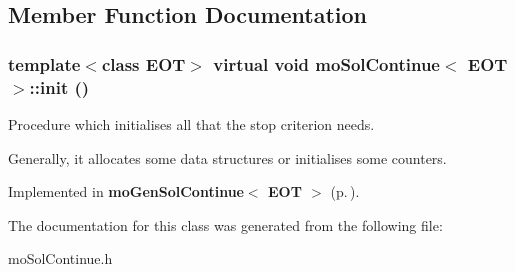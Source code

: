 \subsection{Member Function Documentation}
\subsubsection{\setlength{\rightskip}{0pt plus 5cm}template$<$class EOT$>$ virtual void {\bf mo\-Sol\-Continue}$<$ EOT $>$::init ()\hspace{0.3cm}{\tt  [pure virtual]}}\label{classmo_sol_continue_064dc966a210f4ffb9515be3f03ca4c7}


Procedure which initialises all that the stop criterion needs. 

Generally, it allocates some data structures or initialises some counters. 

Implemented in {\bf mo\-Gen\-Sol\-Continue$<$ EOT $>$} {\rm (p.\,\pageref{classmo_gen_sol_continue_6c5db8182157584b56507cc9075602d4})}.

The documentation for this class was generated from the following file:\begin{CompactItemize}
\item 
mo\-Sol\-Continue.h\end{CompactItemize}
